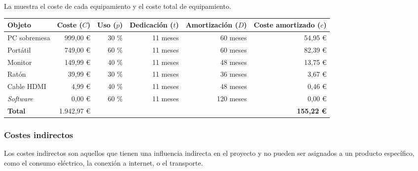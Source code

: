 \noindent
La  muestra el coste de cada equipamiento y el coste total
de equipamiento.


\begin{table}[htb]
    {
      \begin{adjustbox}{max width=\textwidth}
        \begin{tabular}{lrrrrr}
          \toprule
          \textbf{Objeto}   & \textbf{Coste ($C$)} & \textbf{Uso ($p$)} & \textbf{Dedicación ($t$)} & \textbf{Amortización ($D$)} & \textbf{Coste amortizado ($c$)} \\
          \midrule
          PC sobremesa      &  999,00 \euro        & 30 \%              & 11 meses                  &  60 meses                   &  54,95 \euro \\
          Portátil          &  749,00 \euro        & 60 \%              & 11 meses                  &  60 meses                   &  82,39 \euro \\
          Monitor           &  149,99 \euro        & 40 \%              & 11 meses                  &  48 meses                   &  13,75 \euro \\
          Ratón             &   39,99 \euro        & 30 \%              & 11 meses                  &  36 meses                   &   3,67 \euro \\
          Cable HDMI        &    4,99 \euro        & 40 \%              & 11 meses                  &  48 meses                   &   0,46 \euro \\
          \textit{Software} &    0,00 \euro        & 60 \%              & 11 meses                  & 120 meses                   &   0,00 \euro \\
          \midrule
          \textbf{Total}    & 1.942,97 \euro       &                    &                           &                             & \textbf{155,22 \euro} \\
          \bottomrule
        \end{tabular}
      \end{adjustbox}
    }
\end{table}

\subsubsection{Costes indirectos}

Los costes indirectos son aquellos que tienen una influencia indirecta en el
proyecto y no pueden ser asignados a un producto específico, como el consumo
eléctrico, la conexión a internet, o el transporte.

